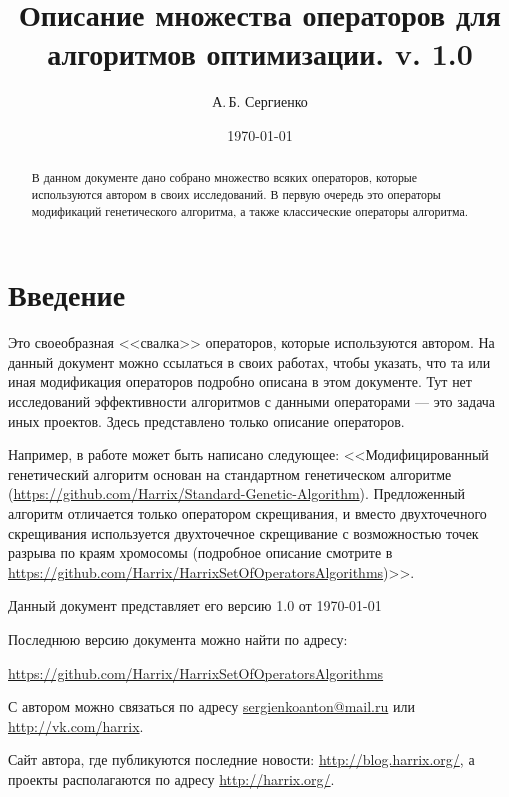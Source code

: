 \documentclass[a4paper,12pt]{article}
\title{Описание множества операторов для алгоритмов оптимизации. v. 1.0}
\author{А.\,Б. Сергиенко}
\date{\today}
\begin{document}


\maketitle

\begin{abstract}
В данном документе дано собрано множество всяких операторов, которые используются автором в своих исследований. В первую очередь это операторы модификаций генетического алгоритма, а также классические операторы алгоритма.
\end{abstract}

\tableofcontents

\newpage

\section{Введение}

Это своеобразная <<свалка>> операторов, которые используются автором. На данный документ можно ссылаться в своих работах, чтобы указать, что та или иная модификация операторов подробно описана в этом документе. Тут нет исследований эффективности алгоритмов с данными операторами --- это задача иных проектов. Здесь представлено только описание операторов.

Например, в работе может быть написано следующее: <<Модифицированный генетический алгоритм основан на стандартном генетическом алгоритме (\href{https://github.com/Harrix/Standard-Genetic-Algorithm}{https://github.com/Harrix/Standard-Genetic-Algorithm}). Предложенный алгоритм отличается только оператором скрещивания, и вместо двухточечного скрещивания используется двухточечное скрещивание с возможностью точек разрыва по краям хромосомы (подробное описание смотрите в \href{https://github.com/Harrix/HarrixSetOfOperatorsAlgorithms}{https://github.com/Harrix/HarrixSetOfOperatorsAlgorithms})>>.

Данный документ представляет его версию 1.0 от \today

Последнюю версию документа можно найти по адресу:

\href{https://github.com/Harrix/HarrixSetOfOperatorsAlgorithms}{https://github.com/Harrix/HarrixSetOfOperatorsAlgorithms}

С автором можно связаться по адресу \href{mailto:sergienkoanton@mail.ru}{sergienkoanton@mail.ru} или  \href{http://vk.com/harrix}{http://vk.com/harrix}.

Сайт автора, где публикуются последние новости: \href{http://blog.harrix.org/}{http://blog.harrix.org/}, а проекты располагаются по адресу \href{http://harrix.org/}{http://harrix.org/}.
\end{document}
